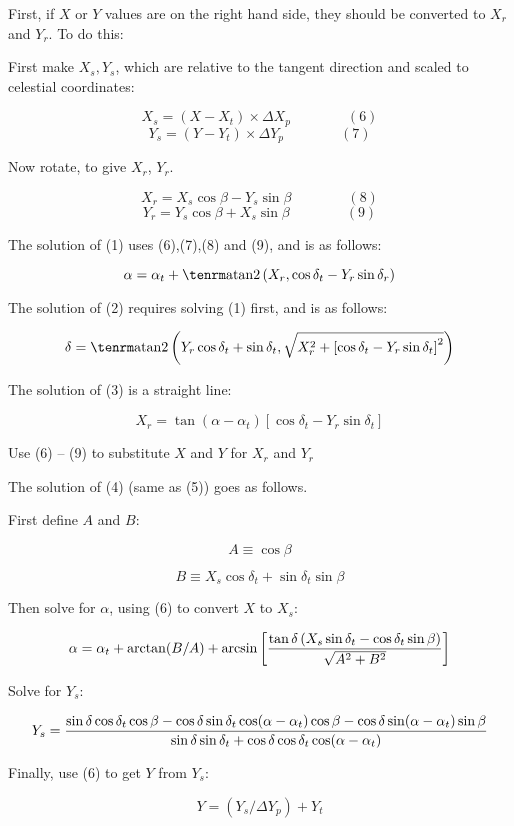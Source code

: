 First, if $X$ or $Y$ values are on the right hand side, they should be converted
to $X_r$ and $Y_r$.  To do this:

\item{}First make $X_s, Y_s$, which are relative to the tangent direction and
scaled to celestial coordinates:

$$X_s = (X - X_t) \times \Delta X_p \qquad\qquad (6)$$
$$Y_s = (Y - Y_t) \times \Delta Y_p \qquad\qquad (7)$$

Now rotate, to give $X_r$, $Y_r$.

$$X_r = X_s \cos \beta - Y_s \sin \beta \qquad\qquad (8)$$
$$Y_r = Y_s \cos \beta + X_s \sin \beta \qquad\qquad (9)$$

The solution of (1) uses (6),(7),(8) and (9), and is as follows:

$$\alpha = \alpha_t + {\rm atan2} \left( X_r, \cos \delta_t - Y_r
\sin \delta_r \right)$$

The solution of (2) requires solving (1) first, and is as follows:

$$\delta = {\rm atan2} \left( Y_r \cos \delta_t + \sin \delta_t,
\sqrt{X_r^2 + \left[ \cos \delta_t - Y_r \sin \delta_t \right]^2} \right)$$

The solution of (3) is a straight line:

$$X_r = \tan(\alpha - \alpha_t) \left[ \cos \delta_t - Y_r \sin
\delta_t \right]$$

\item{}Use (6) -- (9) to substitute $X$ and $Y$ for $X_r$ and $Y_r$

The solution of (4) (same as (5)) goes as
follows. 
\item{}First define $A$ and $B$:

$$A \equiv \cos \beta$$

$$B \equiv X_s \cos \delta_t + \sin \delta_t \sin \beta$$

\item{}Then solve for $\alpha$, using (6) to convert $X$ to $X_s$:

$$\alpha = \alpha_t + \arctan (B/A) + \arcsin \left[
{\tan \delta \left( X_s \sin \delta_t - \cos \delta_t \sin \beta
\right) \over
\sqrt{A^2 + B^2}}
\right] $$

\item{}Solve for $Y_s$:

$$Y_s = { \sin \delta \cos \delta_t \cos \beta
- \cos \delta \sin \delta_t \cos (\alpha - \alpha_t) \cos \beta
- \cos \delta \sin (\alpha - \alpha_t) \sin \beta
\over \sin \delta \sin \delta_t + \cos \delta \cos \delta_t
\cos (\alpha - \alpha_t)}$$

\item{}Finally, use (6) to get $Y$ from $Y_s$:

$$Y = (Y_s /\Delta Y_p) + Y_t$$
\vfill\eject






